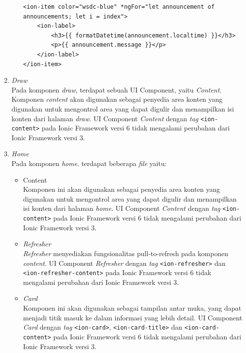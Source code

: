 \begin{enumerate}
\begin{itemize}
\begin{lstlisting}[label={lst:itemWSDCNew}, caption=\textit{Tag} <ion-item> dengan Ionic 6 di Aplikasi WSDC 2017 Bali yang Akan dibuat]
<ion-item color="wsdc-blue" *ngFor="let announcement of announcements; let i = index">
    <ion-label>
    	<h3>{{ formatDatetime(announcement.localtime) }}</h3>
        <p>{{ announcement.message }}</p>
    </ion-label>
</ion-item>
\end{lstlisting}
		
	\end{itemize}
	
	\item \textit{Draw} \\
	Pada komponen \textit{draw}, terdapat sebuah UI Component, yaitu \textit{Content}. Komponen \textit{content} akan digunakan sebagai penyedia area konten yang digunakan untuk mengontrol area yang dapat digulir dan menampilkan isi konten dari halaman \textit{draw}. UI Component \textit{Content} dengan \textit{tag} \texttt{<ion-content>} pada Ionic Framework versi 6 tidak mengalami perubahan dari Ionic Framework versi 3. 
		
	\item \textit{Home}\\
	Pada komponen \textit{home}. terdapat beberapa \textit{file} yaitu:
		\begin{itemize}
			\item Content \\
		Komponen ini akan digunakan sebagai penyedia area konten yang digunakan untuk mengontrol area yang dapat digulir dan menampilkan isi konten dari halaman \textit{home}. UI Component \textit{Content} dengan \textit{tag} \texttt{<ion-content>} pada Ionic Framework versi 6 tidak mengalami perubahan dari Ionic Framework versi 3.
		
			\item \textit{Refresher} \\
		\textit{Refresher} menyediakan fungsionalitas  pull-to-refresh pada komponen \textit{content}. UI Component \textit{Refresher} dengan \textit{tag} \texttt{<ion-refresher>} dan \texttt{<ion-refresher-content>} pada Ionic Framework versi 6 tidak mengalami perubahan dari Ionic Framework versi 3.	
		
			\item \textit{Card} \\
			Komponen ini akan digunakan sebagai tampilan antar muka, yang dapat menjadi titik masuk ke dalam informasi yang lebih detail. UI Component \textit{Card} dengan \textit{tag} \texttt{<ion-card>}, \texttt{<ion-card-title>} dan \texttt{<ion-card-content>} pada Ionic Framework versi 6 tidak mengalami perubahan dari Ionic Framework versi 3.
			

\end{itemize}
\end{enumerate}
